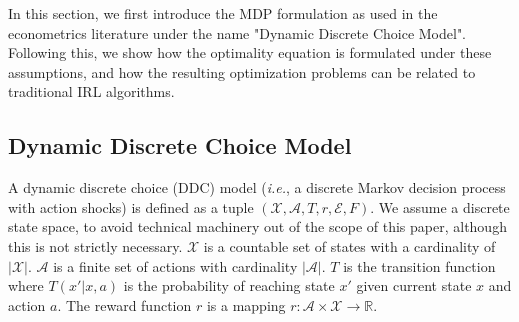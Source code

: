 \documentclass{article}
\begin{document}
In this section, we first introduce the MDP formulation as used in the econometrics literature under the name "Dynamic Discrete Choice Model". Following this, we show how the optimality equation is formulated under these assumptions, and how the resulting optimization problems can be related to traditional IRL algorithms.

\subsection{Dynamic Discrete Choice Model}

A dynamic discrete choice (DDC) model (\emph{i.e.}, a discrete Markov decision process with action shocks) is defined as a tuple $(\mathcal{X,A}, T,r,\mathcal{E},F)$. 
We assume a discrete state space, to avoid technical machinery out of the scope of this paper, although this is not strictly necessary.
$\mathcal{X}$ is a countable set of states with a cardinality of $|\mathcal{X}|$. $\mathcal{A}$ is a finite set of actions with cardinality $|\mathcal{A}|$. $T$ is the transition function where $T(x'|x,a)$ is the probability of reaching state $x'$ given current state $x$ and action $a$. The reward function $r$ is a mapping $r:\mathcal{A}\times\mathcal{X}\rightarrow \mathbb{R}$.
\end{document}
